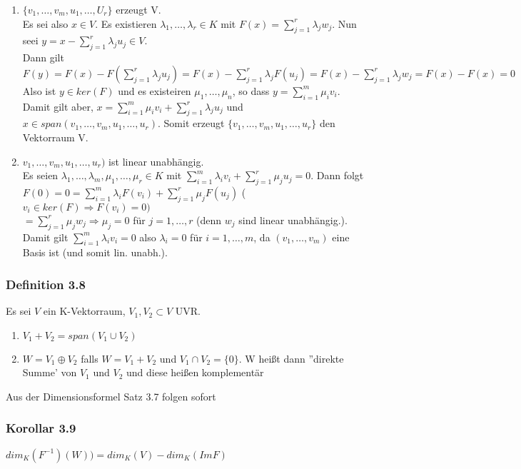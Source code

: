 \documentclass{scrartcl}
\newcommand{\lb}{\lambda}
\begin{document}
\begin{enumerate}
\item{\(\{v_1, \dots, v_m, u_1, \dots, U_r\}\) erzeugt V.\\
Es sei also \(x \in V\). Es existieren \(\lb_1, \dots, \lb_r \in K\) mit \(F(x) = \sum_{j=1}^r \lb_j w_j\). Nun seei \(y = x - \sum_{j=1}^r \lb_j u_j \in V\).\\
Dann gilt \(F(y) = F(x) - F(\sum_{j=1}^r \lb_j u_j) = F(x) - \sum_{j = 1}^r \lb_j F(u_j) = F(x) - \sum_{j = 1}^r \lb_j w_j = F(x) - F(x) = 0\)\\
Also ist \(y \in ker(F)\) und es existeiren \(\mu_1, \dots, \mu_n\), so dass \(y = \sum_{i =1}^m \mu_i v_i\). Damit gilt aber, \(x = \sum_{i=1}^m \mu_i v_i + \sum_{j=1}^r \lb_j u_j\) und \(x \in span(v_1, \dots, v_m, u_1, \dots, u_r)\). Somit erzeugt \(\{v_1, \dots, v_m, u_1, \dots, u_r\}\) den Vektorraum V.
}
\item{\(v_1, \dots, v_m, u_1, \dots, u_r)\) ist linear unabh\"angig.\\
Es seien \(\lb_1,\dots, \lb_m, \mu_1, \dots, \mu_r \in K\) mit \(\sum_{i=1}^m\lb_i v_i + \sum_{j=1}^r \mu_j u_j = 0\). Dann folgt\\
\(F(0) = 0 = \sum_{i=1}^m\lb_i F(v_i) + \sum_{j=1}^r \mu_j F(u_j)\) \hfill (\(v_i \in ker(F) \Rightarrow F(v_i) = 0)\)\\
\(= \sum_{j=1}^r \mu_j w_j \Rightarrow \mu_j = 0\) f\"ur \(j = 1, \dots, r\) (denn \(w_j\) sind linear unabh\"angig.).\\
Damit gilt \(\sum_{i=1}^m \lb_iv_i = 0\) also \(\lb_i = 0\) f\"ur \(i = 1, \dots, m\), da \((v_1, \dots, v_m)\) eine Basis ist (und somit lin. unabh.).
}
\end{enumerate}

\subsubsection{Definition 3.8}
Es sei \(V\) ein K-Vektorraum, \(V_1, V_2 \subset V\) UVR.
\begin{enumerate}
\item{\(V_1 + V_2 = span(V_1 \cup V_2)\)}
\item{\(W = V_1 \oplus V_2\) falls \(W = V_1 + V_2\) und \(V_1 \cap V_2 = \{0\}\). W hei\ss{}t dann ''direkte Summe' von \(V_1\) und \(V_2\) und diese hei\ss{}en komplement\"ar}
\end{enumerate}
Aus der Dimensionsformel Satz 3.7 folgen sofort

\subsubsection{Korollar 3.9}
\(dim_K(F^{-1})(W)) = dim_K(V) - dim_K(Im F)\)
\end{document}
